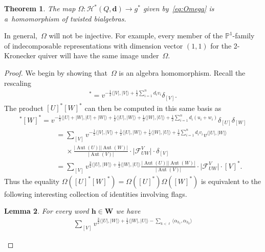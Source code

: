 \documentclass[11pt]{article}
\numberwithin{equation}{section}
\newtheorem{Theorem}{Theorem}[section]
\newtheorem{Lemma}[Theorem]{Lemma}
\begin{document}
\begin{Theorem}
\label{th:shuffle_character}
The map $\Omega: \mathcal{H}^*(Q,\mathbf{d})\to g^*$ given by~\eqref{eq:Omega} is a~homomorphism of twisted bialgebras.
\end{Theorem}

\begin{Remark}
In general,~$\Omega$ will not be injective.
For example, every member of the $\mathbb{P}^1$-family of indecomposable representations with dimension vector $(1,1)$
for the 2-Kronecker quiver will have the same image under~$\Omega$.
\end{Remark}

\begin{proof}
We begin by showing that~$\Omega$ is an algebra homomorphism.
Recall the rescaling
\begin{gather*}
[V]^*=v^{-\frac{1}{2}\langle |V|,|V|\rangle+\frac{1}{2}\sum\limits_{i=1}^n d_iv_i}\delta_{[V]}.
\end{gather*}
The product $[U]^*[W]^*$ can then be computed in this same basis as
\begin{gather*}
[U]^*[W]^*=v^{-\frac{1}{2}\langle |U|+|W|,|U|+|W|\rangle+\frac{1}{2}\langle |U|,|W|\rangle+\frac{1}{2}\langle
|W|,|U|\rangle+\frac{1}{2}\sum\limits_{i=1}^n d_i(u_i+w_i)}\delta_{[U]}\delta_{[W]}
\\
\phantom{[U]^*[W]^*}
 =\sum\limits_{[V]}v^{-\frac{1}{2}\langle |V|,|V|\rangle+\frac{1}{2}\langle |U|,|W|\rangle+\frac{1}{2}\langle
|W|,|U|\rangle+\frac{1}{2}\sum\limits_{i=1}^n d_iv_i}v^{\langle|U|,|W|\rangle}
\\
\phantom{[U]^*[W]^*=}{}
\times
\frac{|\operatorname{Aut}(U)||\operatorname{Aut}(W)|}{|\operatorname{Aut}(V)|}\cdot\big|\mathcal{F}^V_{UW}\big|\cdot \delta_{[V]}
\\
\phantom{[U]^*[W]^*}
 =\sum\limits_{[V]}v^{\frac{3}{2}\langle |U|,|W|\rangle+\frac{1}{2}\langle
|W|,|U|\rangle}\frac{|\operatorname{Aut}(U)||\operatorname{Aut}(W)|}{|\operatorname{Aut}(V)|}\cdot\big|\mathcal{F}^V_{UW}\big|\cdot [V]^*.
\end{gather*}
Thus the equality $\Omega([U]^*[W]^*)=\Omega([U]^*)\Omega([W]^*)$ is equivalent to the following interesting collection
of identities involving f\/lags.
\begin{Lemma}
\label{lem:flag_identity}
For every word $\mathbf{h}\in\mathbf{W}$ we have
\begin{gather}
\nonumber
\sum\limits_{[V]} v^{\frac{3}{2}\langle |U|,|W|\rangle+\frac{1}{2}\langle|W|,|U|\rangle-\sum\limits_{k<\ell}\langle\alpha_{h_\ell},\alpha_{h_k}\rangle}

\end{gather}
\end{Lemma}
\end{proof}
\end{document}
